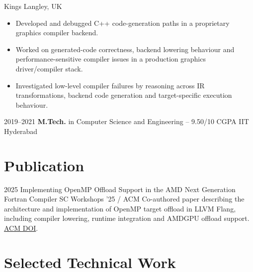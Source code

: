 \documentclass[a4paper]{cv-style}
\begin{document}
\begin{entrylist}
  {Kings Langley, UK}
  {\begin{itemize}
    \item Developed and debugged C++ code-generation paths in a proprietary graphics compiler backend.
    \item Worked on generated-code correctness, backend lowering behaviour and performance-sensitive compiler issues in a production graphics driver/compiler stack.
    \item Investigated low-level compiler failures by reasoning across IR transformations, backend code generation and target-specific execution behaviour.
  \end{itemize}}
\headlineentry
  {2019--2021}
  {\textbf{M.Tech.} in Computer Science and Engineering -- 9.50/10 CGPA}
  {IIT Hyderabad}
  {\vspace{-0.15cm}}
\end{entrylist}

\newpage

\section{Publication}

\begin{entrylist}
\entry
  {2025}
  {Implementing OpenMP Offload Support in the AMD Next Generation Fortran Compiler}
  {SC Workshops '25 / ACM}
  {Co-authored paper describing the architecture and implementation of OpenMP target offload in LLVM Flang, including compiler lowering, runtime integration and AMDGPU offload support. \href{https://doi.org/10.1145/3731599.3767478}{ACM DOI}.}
\end{entrylist}

\section{Selected Technical Work}
\end{document}
